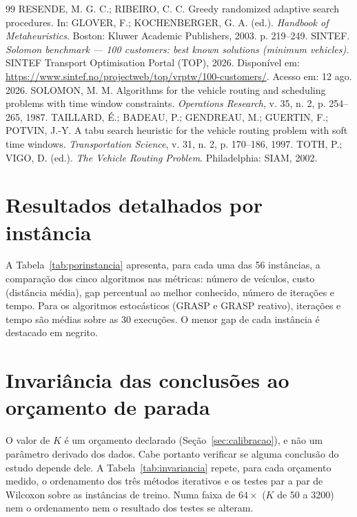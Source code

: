 \documentclass[12pt, a4paper]{article}
\begin{document}
\begin{thebibliography}{99}
 RESENDE, M. G. C.; RIBEIRO, C. C. Greedy randomized adaptive search procedures. In: GLOVER, F.; KOCHENBERGER, G. A. (ed.). \textit{Handbook of Metaheuristics}. Boston: Kluwer Academic Publishers, 2003. p. 219--249.
 SINTEF. \textit{Solomon benchmark --- 100 customers: best known solutions (minimum vehicles)}. SINTEF Transport Optimisation Portal (TOP), 2026. Disponível em: \url{https://www.sintef.no/projectweb/top/vrptw/100-customers/}. Acesso em: 12 ago. 2026.
 SOLOMON, M. M. Algorithms for the vehicle routing and scheduling problems with time window constraints. \textit{Operations Research}, v. 35, n. 2, p. 254--265, 1987.
 TAILLARD, É.; BADEAU, P.; GENDREAU, M.; GUERTIN, F.; POTVIN, J.-Y. A tabu search heuristic for the vehicle routing problem with soft time windows. \textit{Transportation Science}, v. 31, n. 2, p. 170--186, 1997.
 TOTH, P.; VIGO, D. (ed.). \textit{The Vehicle Routing Problem}. Philadelphia: SIAM, 2002.
\end{thebibliography}

\appendix
\section{Resultados detalhados por instância}\label{ap:porinstancia}
A Tabela~\ref{tab:porinstancia} apresenta, para cada uma das 56 instâncias, a comparação dos cinco algoritmos nas métricas: número de veículos, custo (distância média), gap percentual ao melhor conhecido, número de iterações e tempo. Para os algoritmos estocásticos (GRASP e GRASP reativo), iterações e tempo são médias sobre as 30 execuções. O menor gap de cada instância é destacado em negrito.



\section{Invariância das conclusões ao orçamento de parada}\label{ap:orcamento}
O valor de $K$ é um orçamento declarado (Seção~\ref{sec:calibracao}), e não um parâmetro derivado dos dados. Cabe portanto verificar se alguma conclusão do estudo depende dele. A Tabela~\ref{tab:invariancia} repete, para cada orçamento medido, o ordenamento dos três métodos iterativos e os testes par a par de Wilcoxon sobre as instâncias de treino. Numa faixa de $64\times$ ($K$ de 50 a 3200) nem o ordenamento nem o resultado dos testes se alteram.


\end{document}
